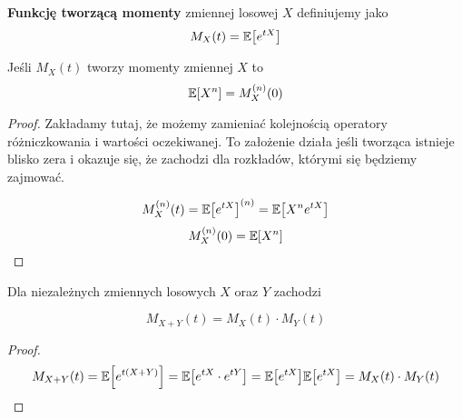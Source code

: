 \begin{definition}
    \textbf{Funkcję tworzącą momenty} zmiennej losowej \( X \) definiujemy jako
    \[
        M_X(t) = \expected{e^{tX}}
    \]
\end{definition}

\begin{theorem}[Twierdzenie 4.1  P\&C]
    Jeśli \( M_X(t) \) tworzy momenty zmiennej \( X \) to
    \[
        \expected{X^n} = M_X^{(n)}(0)
    \]
\end{theorem}
\begin{proof}
    Zakładamy tutaj, że możemy zamieniać kolejnością operatory różniczkowania i wartości oczekiwanej.
    To założenie działa jeśli tworząca istnieje blisko zera i okazuje się, że zachodzi dla rozkładów, którymi się będziemy zajmować.
    
    \[
        M_X^{(n)}(t) = \expected{e^{tX}}^{(n)}
        = \expected{X^n e^{tX}}
    \]
    \[
        M_X^{(n)}(0) = \expected{X^n}
    \]
\end{proof}

\begin{theorem}[Twierdzenie 4.3 P\&C]
    Dla niezależnych zmiennych losowych \( X \) oraz \( Y \) zachodzi
    
    \[
        M_{X + Y}(t) = M_X(t) \cdot M_Y(t)
    \]
\end{theorem}
\begin{proof}
    \[
        M_{X + Y}(t) = \expected{e^{t(X + Y)}} = \expected{e^{tX}\cdot e^{tY}} = \expected{e^{tX}}\expected{e^{tX}} = M_X(t) \cdot M_Y(t)
    \]
\end{proof}
